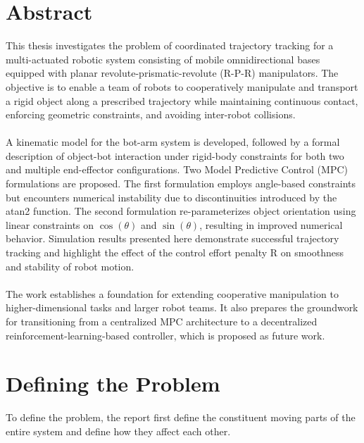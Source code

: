 \documentclass[12pt,english]{report}
\begin{document}
\chapter{Abstract}
This thesis investigates the problem of coordinated trajectory tracking for a multi-actuated robotic system consisting of mobile omnidirectional bases equipped with planar revolute-prismatic-revolute (R-P-R) manipulators. The objective is to enable a team of robots to cooperatively manipulate and transport a rigid object along a prescribed trajectory while maintaining continuous contact, enforcing geometric constraints, and avoiding inter-robot collisions.\\
\\
A kinematic model for the bot-arm system is developed, followed by a formal description of object-bot interaction under rigid-body constraints for both two and multiple end-effector configurations. Two Model Predictive Control (MPC) formulations are proposed. The first formulation employs angle-based constraints but encounters numerical instability due to discontinuities introduced by the atan2 function. The second formulation re-parameterizes object orientation using linear constraints on $\cos(\theta)$ and $\sin(\theta)$, resulting in improved numerical behavior. Simulation results presented here demonstrate successful trajectory tracking and highlight the effect of the control effort penalty R on smoothness and stability of robot motion.\\
\\
The work establishes a foundation for extending cooperative manipulation to higher-dimensional tasks and larger robot teams. It also prepares the groundwork for transitioning from a centralized MPC architecture to a decentralized reinforcement-learning-based controller, which is proposed as future work.





\chapter{Defining the Problem}
To define the problem, the report first define the constituent moving parts of the entire system and define how they affect each other.
\end{document}
